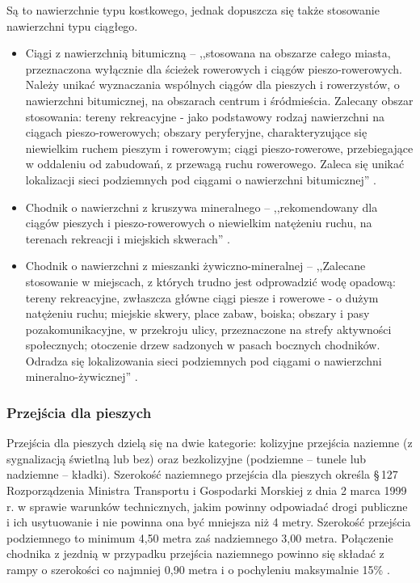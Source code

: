 \documentclass[twoside,12pt]{article}
\begin{document}
	 Są to nawierzchnie typu kostkowego, jednak dopuszcza się także stosowanie nawierzchni typu ciągłego.
	 
	 \begin{itemize}\setlength{\itemsep}{0em}
	 \item Ciągi z nawierzchnią bitumiczną --  ,,stosowana na obszarze całego miasta, przeznaczona wyłącznie dla ścieżek rowerowych i ciągów pieszo-rowerowych. Należy unikać wyznaczania wspólnych ciągów dla pieszych i rowerzystów, o nawierzchni bitumicznej, na obszarach centrum i śródmieścia. Zalecany obszar stosowania: tereny rekreacyjne - jako podstawowy rodzaj nawierzchni na ciągach pieszo-rowerowych;  obszary peryferyjne, charakteryzujące się niewielkim ruchem pieszym i rowerowym; ciągi pieszo-rowerowe, przebiegające w oddaleniu od zabudowań, z przewagą ruchu rowerowego.  Zaleca się unikać lokalizacji sieci podziemnych pod ciągami o nawierzchni bitumicznej'' \cite{standardy_wroclaw}. 
	\item Chodnik o nawierzchni z kruszywa mineralnego -- ,,rekomendowany dla ciągów pieszych i pieszo-rowerowych o niewielkim natężeniu ruchu, na terenach rekreacji i miejskich skwerach'' \cite{standardy_wroclaw}.
	\item Chodnik o nawierzchni z mieszanki żywiczno-mineralnej -- ,,Zalecane stosowanie w miejscach, z których trudno jest odprowadzić wodę opadową: tereny rekreacyjne, zwłaszcza główne ciągi piesze i rowerowe - o dużym natężeniu ruchu;  miejskie skwery, place zabaw, boiska; obszary i pasy pozakomunikacyjne, w przekroju ulicy, przeznaczone na strefy aktywności społecznych; otoczenie drzew sadzonych w pasach bocznych chodników. Odradza się lokalizowania sieci podziemnych pod ciągami o nawierzchni mineralno-żywicznej'' \cite{standardy_wroclaw}. 
	 \end{itemize}
	 
	 \subsubsection{Przejścia dla pieszych}
	 
	 Przejścia dla pieszych dzielą się na dwie kategorie: kolizyjne przejścia naziemne (z sygnalizacją świetlną lub bez) oraz bezkolizyjne (podziemne -- tunele lub nadziemne -- kładki). Szerokość naziemnego przejścia dla pieszych określa §\,127 Rozporządzenia Ministra Transportu i Gospodarki Morskiej z dnia 2 marca 1999 r. w sprawie warunków technicznych, jakim powinny odpowiadać drogi publiczne i ich usytuowanie i nie powinna ona być mniejsza niż 4 metry. Szerokość przejścia podziemnego to minimum 4,50 metra zaś nadziemnego 3,00 metra. Połączenie chodnika z jezdnią w przypadku przejścia naziemnego powinno się składać z rampy o szerokości co najmniej 0,90 metra i o pochyleniu maksymalnie 15\% \cite{rozporzadzenie_drogi}.
	 
\end{document}
